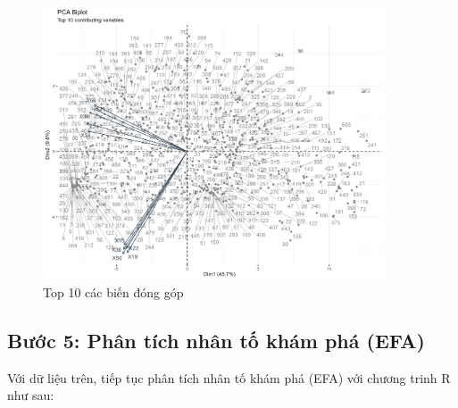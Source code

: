 \begin{figure}[h!]
    \includegraphics[width=0.9\textwidth]{../../assets/images/SP43.png}
    \caption{Top 10 các biến đóng góp }
\end{figure}

\subsection{Bước 5: Phân tích nhân tố khám phá (EFA)}

Với dữ liệu trên, tiếp tục phân tích nhân tố khám phá (EFA) với chương trinh R như sau:

